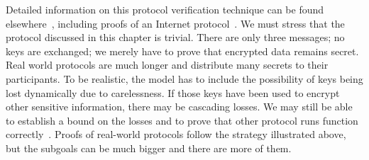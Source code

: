 \begin{isabellebody}
\begin{isamarkuptext}
\medskip

Detailed information on this protocol verification technique can be found
elsewhere~\cite{paulson-jcs}, including proofs of an Internet
protocol~\cite{paulson-tls}.  We must stress that the protocol discussed
in this chapter is trivial.  There are only three messages; no keys are
exchanged; we merely have to prove that encrypted data remains secret. 
Real world protocols are much longer and distribute many secrets to their
participants.  To be realistic, the model has to include the possibility
of keys being lost dynamically due to carelessness.  If those keys have
been used to encrypt other sensitive information, there may be cascading
losses.  We may still be able to establish a bound on the losses and to
prove that other protocol runs function
correctly~\cite{paulson-yahalom}.  Proofs of real-world protocols follow
the strategy illustrated above, but the subgoals can
be much bigger and there are more of them.
%
\end{isamarkuptext}%
\isamarkuptrue%
%
\isadelimtheory
%
\endisadelimtheory
%
\isatagtheory
%
\endisatagtheory
{\isafoldtheory}%
%
\isadelimtheory
%
\endisadelimtheory
\end{isabellebody}%
